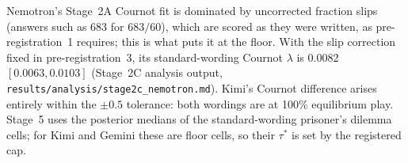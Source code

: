 \documentclass[11pt]{article}
\theoremstyle{definition}
\theoremstyle{remark}
\newcommand{\lam}{\lambda}
\begin{document}
\noindent Nemotron's Stage~2A Cournot fit is dominated by uncorrected fraction slips (answers
such as 683 for $683/60$), which are scored as they were written, as pre-registration~1
requires; this is what puts it at the floor. With the slip correction fixed in
pre-registration~3, its standard-wording Cournot $\lam$ is 0.0082 $[0.0063,0.0103]$ (Stage~2C
analysis output, \texttt{results/analysis/stage2c\_nemotron.md}). Kimi's Cournot difference
arises entirely within the $\pm0.5$ tolerance: both wordings are at 100\% equilibrium play. Stage~5
uses the posterior medians of the standard-wording prisoner's dilemma cells; for Kimi and Gemini
these are floor cells, so their $\tau^*$ is set by the registered cap.
\end{document}

